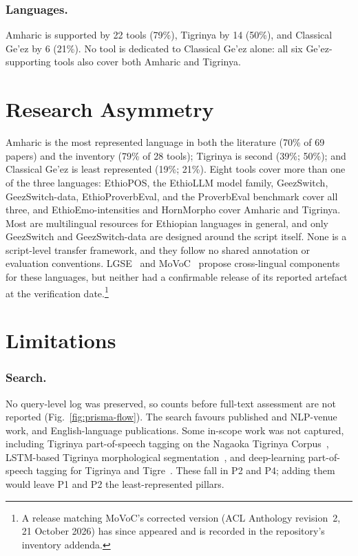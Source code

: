 \documentclass[runningheads]{llncs}
\begin{document}
\subsubsection{Languages.} Amharic is supported by 22 tools (79\%), Tigrinya by 14 (50\%), and Classical Ge'ez by 6 (21\%). No tool is dedicated to Classical Ge'ez alone: all six Ge'ez-supporting tools also cover both Amharic and Tigrinya.

\section{Research Asymmetry}\label{sec:asymmetry}

Amharic is the most represented language in both the literature (70\% of 69 papers) and the inventory (79\% of 28 tools); Tigrinya is second (39\%; 50\%); and Classical Ge'ez is least represented (19\%; 21\%). Eight tools cover more than one of the three languages: EthioPOS, the EthioLLM model family, GeezSwitch, GeezSwitch-data, EthioProverbEval, and the ProverbEval benchmark cover all three, and EthioEmo-intensities and HornMorpho cover Amharic and Tigrinya. Most are multilingual resources for Ethiopian languages in general, and only GeezSwitch and GeezSwitch-data are designed around the script itself. None is a script-level transfer framework, and they follow no shared annotation or evaluation conventions. LGSE~\cite{teklehaymanot_lgse_2026} and MoVoC~\cite{teklehaymanot_movoc_2025} propose cross-lingual components for these languages, but neither had a confirmable release of its reported artefact at the verification date.\footnote{A release matching MoVoC's corrected version (ACL Anthology revision~2, 21 October 2026) has since appeared and is recorded in the repository's inventory addenda.}

\section{Limitations}\label{sec:limitations}

\subsubsection{Search.} No query-level log was preserved, so counts before full-text assessment are not reported (Fig.~\ref{fig:prisma-flow}). The search favours published and NLP-venue work, and English-language publications. Some in-scope work was not captured, including Tigrinya part-of-speech tagging on the Nagaoka Tigrinya Corpus~\cite{tedla_tigrinya_2016}, LSTM-based Tigrinya morphological segmentation~\cite{tedla_morphological_2018}, and deep-learning part-of-speech tagging for Tigrinya and Tigre~\cite{kapociute_northern_2020}. These fall in P2 and P4; adding them would leave P1 and P2 the least-represented pillars.
\end{document}
